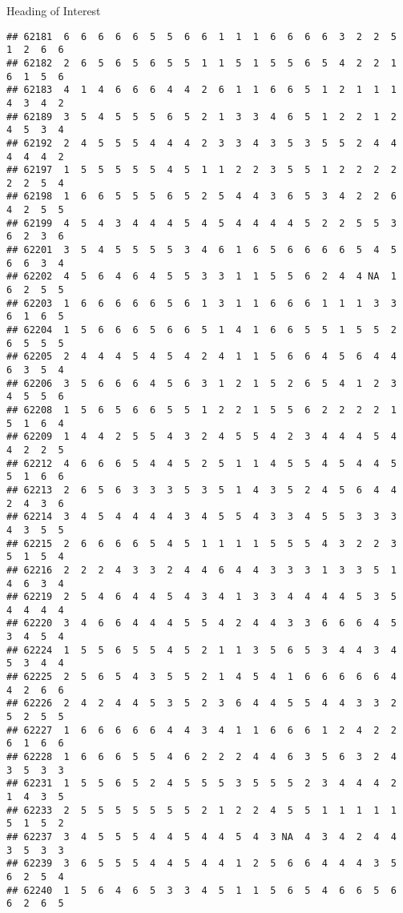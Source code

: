 \documentclass[
  ignorenonframetext,
]{beamer}
\begin{document}
\begin{frame}[fragile]{Heading of Interest}
\begin{verbatim}
## 62181  6  6  6  6  6  5  5  6  6  1  1  1  6  6  6  6  3  2  2  5  1  2  6  6
## 62182  2  6  5  6  5  6  5  5  1  1  5  1  5  5  6  5  4  2  2  1  6  1  5  6
## 62183  4  1  4  6  6  6  4  4  2  6  1  1  6  6  5  1  2  1  1  1  4  3  4  2
## 62189  3  5  4  5  5  5  6  5  2  1  3  3  4  6  5  1  2  2  1  2  4  5  3  4
## 62192  2  4  5  5  5  4  4  4  2  3  3  4  3  5  3  5  5  2  4  4  4  4  4  2
## 62197  1  5  5  5  5  5  4  5  1  1  2  2  3  5  5  1  2  2  2  2  2  2  5  4
## 62198  1  6  6  5  5  5  6  5  2  5  4  4  3  6  5  3  4  2  2  6  4  2  5  5
## 62199  4  5  4  3  4  4  4  5  4  5  4  4  4  4  5  2  2  5  5  3  6  2  3  6
## 62201  3  5  4  5  5  5  5  3  4  6  1  6  5  6  6  6  6  5  4  5  6  6  3  4
## 62202  4  5  6  4  6  4  5  5  3  3  1  1  5  5  6  2  4  4 NA  1  6  2  5  5
## 62203  1  6  6  6  6  6  5  6  1  3  1  1  6  6  6  1  1  1  3  3  6  1  6  5
## 62204  1  5  6  6  6  5  6  6  5  1  4  1  6  6  5  5  1  5  5  2  6  5  5  5
## 62205  2  4  4  4  5  4  5  4  2  4  1  1  5  6  6  4  5  6  4  4  6  3  5  4
## 62206  3  5  6  6  6  4  5  6  3  1  2  1  5  2  6  5  4  1  2  3  4  5  5  6
## 62208  1  5  6  5  6  6  5  5  1  2  2  1  5  5  6  2  2  2  2  1  5  1  6  4
## 62209  1  4  4  2  5  5  4  3  2  4  5  5  4  2  3  4  4  4  5  4  4  2  2  5
## 62212  4  6  6  6  5  4  4  5  2  5  1  1  4  5  5  4  5  4  4  5  5  1  6  6
## 62213  2  6  5  6  3  3  3  5  3  5  1  4  3  5  2  4  5  6  4  4  2  4  3  6
## 62214  3  4  5  4  4  4  4  3  4  5  5  4  3  3  4  5  5  3  3  3  4  3  5  5
## 62215  2  6  6  6  6  5  4  5  1  1  1  1  5  5  5  4  3  2  2  3  5  1  5  4
## 62216  2  2  2  4  3  3  2  4  4  6  4  4  3  3  3  1  3  3  5  1  4  6  3  4
## 62219  2  5  4  6  4  4  5  4  3  4  1  3  3  4  4  4  4  5  3  5  4  4  4  4
## 62220  3  4  6  6  4  4  4  5  5  4  2  4  4  3  3  6  6  6  4  5  3  4  5  4
## 62224  1  5  5  6  5  5  4  5  2  1  1  3  5  6  5  3  4  4  3  4  5  3  4  4
## 62225  2  5  6  5  4  3  5  5  2  1  4  5  4  1  6  6  6  6  6  4  4  2  6  6
## 62226  2  4  2  4  4  5  3  5  2  3  6  4  4  5  5  4  4  3  3  2  5  2  5  5
## 62227  1  6  6  6  6  6  4  4  3  4  1  1  6  6  6  1  2  4  2  2  6  1  6  6
## 62228  1  6  6  6  5  5  4  6  2  2  2  4  4  6  3  5  6  3  2  4  3  5  3  3
## 62231  1  5  5  6  5  2  4  5  5  5  3  5  5  5  2  3  4  4  4  2  1  4  3  5
## 62233  2  5  5  5  5  5  5  5  2  1  2  2  4  5  5  1  1  1  1  1  5  1  5  2
## 62237  3  4  5  5  5  4  4  5  4  4  5  4  3 NA  4  3  4  2  4  4  3  5  3  3
## 62239  3  6  5  5  5  4  4  5  4  4  1  2  5  6  6  4  4  4  3  5  6  2  5  4
## 62240  1  5  6  4  6  5  3  3  4  5  1  1  5  6  5  4  6  6  5  6  6  2  6  5

\end{verbatim}
\end{frame}
\end{document}

